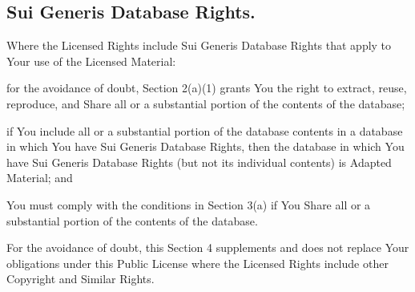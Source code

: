   \subsection{Sui Generis Database Rights.}
    Where the Licensed Rights include Sui Generis Database Rights that apply to Your use of the Licensed Material:
    \begin{myEnumerate}
      \item for the avoidance of doubt, Section 2(a)(1) grants You the right to extract, reuse, reproduce, and Share all or a
      substantial portion of the contents of the database;
      \item if You include all or a substantial portion of the database contents in a database in which You have Sui Generis
      Database Rights, then the database in which You have Sui Generis Database Rights (but not its individual contents) is
      Adapted Material; and
      \item You must comply with the conditions in Section 3(a) if You Share all or a substantial portion of the contents of
      the database.
    \end{myEnumerate}
    For the avoidance of doubt, this Section 4 supplements and does not replace Your obligations under this Public License
    where the Licensed Rights include other Copyright and Similar Rights.

